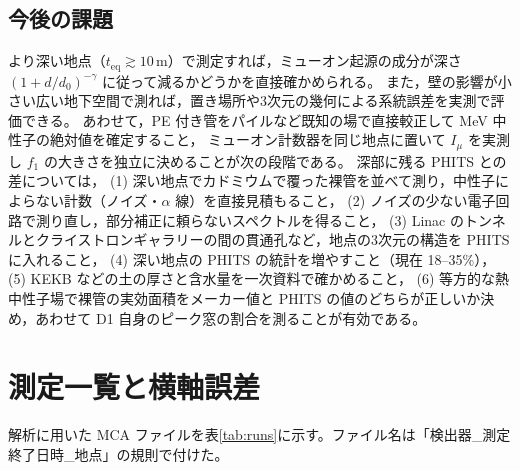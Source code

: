 \documentclass[a4paper,11pt]{ltjsarticle}
\newcommand{\teq}{t_{\mathrm{eq}}}
\begin{document}
\subsection*{今後の課題}

より深い地点（$\teq\gtrsim10$\,m）で測定すれば，ミューオン起源の成分が深さ $(1+d/d_0)^{-\gamma}$ に従って減るかどうかを直接確かめられる。
また，壁の影響が小さい広い地下空間で測れば，置き場所や3次元の幾何による系統誤差を実測で評価できる。
あわせて，PE 付き管をパイルなど既知の場で直接較正して MeV 中性子の絶対値を確定すること，
ミューオン計数器を同じ地点に置いて $I_\mu$ を実測し $f_1$ の大きさを独立に決めることが次の段階である。
深部に残る PHITS との差については，
(1) 深い地点でカドミウムで覆った裸管を並べて測り，中性子によらない計数（ノイズ・$\alpha$ 線）を直接見積もること，
(2) ノイズの少ない電子回路で測り直し，部分補正に頼らないスペクトルを得ること，
(3) Linac のトンネルとクライストロンギャラリーの間の貫通孔など，地点の3次元の構造を PHITS に入れること，
(4) 深い地点の PHITS の統計を増やすこと（現在 18--35\%），
(5) KEKB などの土の厚さと含水量を一次資料で確かめること，
(6) 等方的な熱中性子場で裸管の実効面積をメーカー値と PHITS の値のどちらが正しいか決め，あわせて D1 自身のピーク窓の割合を測ることが有効である。

\appendix
\section{測定一覧と横軸誤差}
\label{app:runs}

解析に用いた MCA ファイルを表\ref{tab:runs}に示す。ファイル名は「検出器\_測定終了日時\_地点」の規則で付けた。
\end{document}

